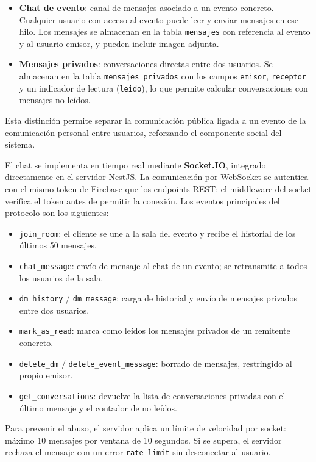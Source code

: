 \begin{itemize}
    \item \textbf{Chat de evento}: canal de mensajes asociado a un evento concreto. Cualquier usuario con acceso al evento puede leer y enviar mensajes en ese hilo. Los mensajes se almacenan en la tabla \texttt{mensajes} con referencia al evento y al usuario emisor, y pueden incluir imagen adjunta.
    \item \textbf{Mensajes privados}: conversaciones directas entre dos usuarios. Se almacenan en la tabla \texttt{mensajes\_privados} con los campos \texttt{emisor}, \texttt{receptor} y un indicador de lectura (\texttt{leido}), lo que permite calcular conversaciones con mensajes no leídos.
\end{itemize}

Esta distinción permite separar la comunicación pública ligada a un evento de la comunicación personal entre usuarios, reforzando el componente social del sistema.

El chat se implementa en tiempo real mediante \textbf{Socket.IO}, integrado directamente en el servidor NestJS. La comunicación por WebSocket se autentica con el mismo token de Firebase que los endpoints REST: el middleware del socket verifica el token antes de permitir la conexión. Los eventos principales del protocolo son los siguientes:

\begin{itemize}
    \item \texttt{join\_room}: el cliente se une a la sala del evento y recibe el historial de los últimos 50 mensajes.
    \item \texttt{chat\_message}: envío de mensaje al chat de un evento; se retransmite a todos los usuarios de la sala.
    \item \texttt{dm\_history} / \texttt{dm\_message}: carga de historial y envío de mensajes privados entre dos usuarios.
    \item \texttt{mark\_as\_read}: marca como leídos los mensajes privados de un remitente concreto.
    \item \texttt{delete\_dm} / \texttt{delete\_event\_message}: borrado de mensajes, restringido al propio emisor.
    \item \texttt{get\_conversations}: devuelve la lista de conversaciones privadas con el último mensaje y el contador de no leídos.
\end{itemize}

Para prevenir el abuso, el servidor aplica un límite de velocidad por socket: máximo 10 mensajes por ventana de 10 segundos. Si se supera, el servidor rechaza el mensaje con un error \texttt{rate\_limit} sin desconectar al usuario.

